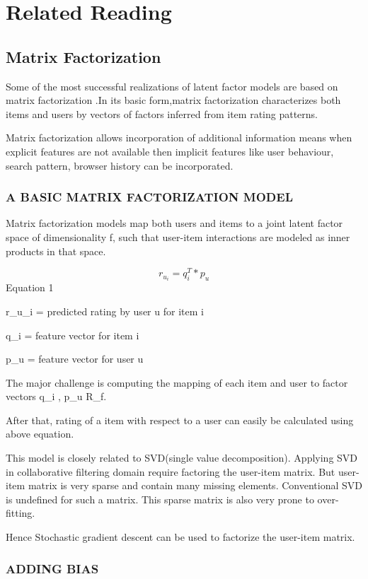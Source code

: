 \chapter{Related Reading}\label{chap1}
\section{Matrix Factorization} \label{sec1.1}
Some of the most successful realizations of latent factor models are based on matrix factorization .In its basic form,matrix factorization characterizes both items and users by vectors of factors inferred from item rating patterns.

Matrix factorization allows incorporation of additional information means when explicit features are not available then implicit features like user behaviour, search pattern, browser history can be incorporated.

\subsection{A BASIC MATRIX FACTORIZATION MODEL\cite{mainpaper}}
Matrix factorization models map both users and items
to a joint latent factor space of dimensionality f, such that
user-item interactions are modeled as inner products in
that space.

\[r_u_i = q_i^T*p_u\]
    								Equation 1

r_u_i = predicted rating by user u for item i

q_i = feature vector for item i

p_u = feature vector for user u

The major challenge is computing the mapping of each item and user to factor vectors q_i , p_u \subset R_f.


After that, rating of a item with respect to a user can easily be calculated using above equation.

This model is closely related to SVD(single value decomposition). Applying SVD in collaborative filtering domain require factoring the user-item matrix. But user-item matrix is very sparse and contain many missing elements. Conventional SVD is undefined for such a matrix. This sparse matrix is also very prone to over-fitting. 

Hence Stochastic gradient descent can be used to factorize the user-item matrix.

\subsection{ADDING BIAS}

